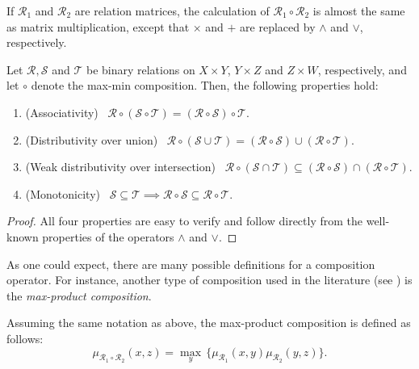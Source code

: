 \begin{remark} If $\mathcal R_1$ and $\mathcal R_2$ are relation matrices, the calculation of $\mathcal R_1 \circ \mathcal R_2$ is almost the same as matrix multiplication, except that $\times$ and $+$ are replaced by $\land$ and $\lor$, respectively.

\end{remark}

\begin{prop} Let $\mathcal R, \mathcal S$ and $\mathcal T$ be binary relations on $X \times Y$, $Y \times Z$ and $Z \times W$, respectively, and let $\circ$ denote the max-min composition. Then, the following properties hold:

\begin{enumerate}
\item (Associativity) \ $\mathcal R \circ (\mathcal S \circ \mathcal T) = (\mathcal R \circ \mathcal S) \circ \mathcal T$.
\item (Distributivity  over union) \ $\mathcal R \circ (\mathcal S \cup \mathcal T) = (\mathcal R \circ \mathcal S) \cup (\mathcal R \circ \mathcal T)$.
\item (Weak distributivity over intersection) \ $\mathcal R \circ (\mathcal S \cap \mathcal T) \subseteq (\mathcal R \circ \mathcal S) \cap (\mathcal R \circ \mathcal T)$.
\item (Monotonicity) \ $\mathcal S \subseteq \mathcal T \implies \mathcal R \circ \mathcal S \subseteq \mathcal R \circ \mathcal T$.
\end{enumerate}

\end{prop}

\begin{proof}
  All four properties are easy to verify and follow directly from the well-known properties of the operators $\land$ and $\lor$.
\end{proof}

As one could expect, there are many possible definitions for a composition operator. For instance, another type of composition used in the literature (see \cite{markovsii2004solution, loetamonphong2001optimization}) is the \textit{max-product composition}.

\begin{definition} Assuming the same notation as above, the max-product composition is defined as follows:
\[
\mu_{\mathcal R_1 \circ \mathcal R_2}(x,z) = \max_{y} \, \{ \mu_{\mathcal R_1}(x,y) \mu_{\mathcal R_2}(y,z) \}.
\]

\end{definition}

